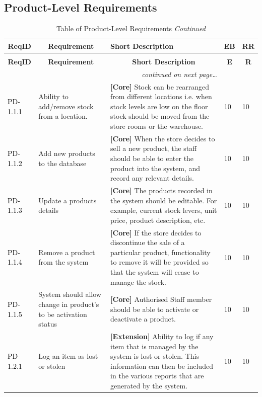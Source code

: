 \documentclass[a4paper]{article}
\begin{document}
\subsection{Product-Level Requirements}
\begin{longtable}{|l|p{5cm}|p{7cm}|p{0.5cm}|p{0.5cm}|}
  \caption{Table of Product-Level Requirements}\\
  \hline
  \multicolumn{1}{|c|}{\textbf{ReqID}}  &
  \multicolumn{1}{|c|}{\textbf{Requirement}} &
  \textbf{Short Description}&
  \textbf{EB} & 
  \textbf{RR}\\
  \hline\hline
  \endfirsthead
  \caption[]{Table of Product-Level Requirements \textit{Continued}}\\
  \hline
  \multicolumn{1}{|c|}{\textbf{ReqID}} &
  \multicolumn{1}{|c|}{\textbf{Requirement}} &
  \multicolumn{1}{|c|}{\textbf{Short Description}} & 
  \multicolumn{1}{|c|}{\textbf{E}} & 
  \multicolumn{1}{|c|}{\textbf{R}}\\
  \hline\hline
  \endhead
  \hline
  \multicolumn{3}{r}{\textit{continued on next page\ldots}}\\
  \endfoot
  \hline
  \endlastfoot
\textcolor{black}{PD-1.1.1} & Ability to add/remove stock from a location. & \textbf{[Core] }Stock can be rearranged from different locations i.e. when stock levels are low on the floor stock should be moved from the store rooms or the warehouse. & 10 & 10\\
\textcolor{black}{PD-1.1.2} & Add new products to the database & \textbf{[Core] }When the store decides to sell a new product, the staff should be able to enter the product into the system, and record any relevant details. & 10 & 10\\
\textcolor{black}{PD-1.1.3} & Update a products details & \textbf{[Core] }The products recorded in the system should be editable. For example, current stock levers, unit price, product description, etc.& 10 & 10\\
\textcolor{black}{PD-1.1.4} & Remove a product from the system & \textbf{[Core] }If the store decides to discontinue the sale of a particular product, functionality to remove it will be provided so that the system will cease to manage the stock.& 10 & 10\\
\textcolor{black}{PD-1.1.5} & System should allow change in product's to be activation status & \textbf{[Core] }Authorised Staff member should be able to activate or deactivate a product.& 10 & 10\\
\hline
\textcolor{black}{PD-1.2.1} & Log an item as lost or stolen & \textbf{[Extension] }Ability to log if any item that is managed by the system is lost or stolen. This information can then be included in the various reports that are generated by the system.& 10 & 10\\

\end{longtable}
\end{document}
